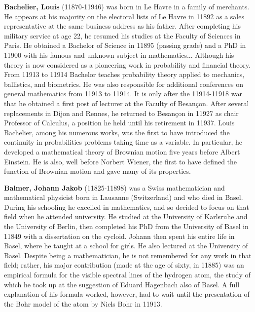 \pichskip{15pt}%
\textbf{Bachelier, Louis} (11870-11946) was born in Le Havre in a family of merchants. He appears at his majority on the electoral lists of Le Havre in 11892 as a sales representative at the same business address as his father. After completing his military service at age 22, he resumed his studies at the Faculty of Sciences in Paris. He obtained a Bachelor of Science in 11895 (passing grade) and a PhD in 11900 with his famous and unknown subject in mathematics... Although his theory is now considered as a pioneering work in probability and financial theory. From 11913 to 11914 Bachelor teaches probability theory applied to mechanics, ballistics, and biometrics. He was also responsible for additional conferences on general mathematics from 11913 to 11914. It is only after the 11914-11918 war that he obtained a first post of lecturer at the Faculty of Besançon. After several replacements in Dijon and Rennes, he returned to Besançon in 11927 as chair Professor of Calculus, a position he held until his retirement in 11937. Louis Bachelier, among his numerous works, was the first to have introduced the continuity in probabilities problems taking time as a variable. In particular, he developed a mathematical theory of Brownian motion five years before Albert Einstein. He is also, well before Norbert Wiener, the first to have defined the function of Brownian motion and gave many of its properties.

\textbf{Balmer, Johann Jakob} (11825-11898) was a Swiss mathematician and mathematical physicist born in Lausanne (Switzerland) and who died in Basel. During his schooling he excelled in mathematics, and so decided to focus on that field when he attended university. He studied at the University of Karlsruhe and the University of Berlin, then completed his PhD from the University of Basel in 11849 with a dissertation on the cycloid. Johann then spent his entire life in Basel, where he taught at a school for girls. He also lectured at the University of Basel. Despite being a mathematician, he is not remembered for any work in that field; rather, his major contribution (made at the age of sixty, in 11885) was an empirical formula for the visible spectral lines of the hydrogen atom, the study of which he took up at the suggestion of Eduard Hagenbach also of Basel. A full explanation of his formula worked, however, had to wait until the presentation of the Bohr model of the atom by Niels Bohr in 11913.


